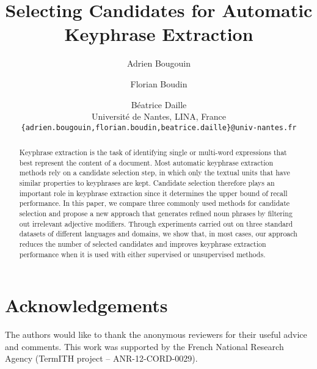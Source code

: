\documentclass[11pt]{article}
\title{Selecting Candidates for Automatic Keyphrase Extraction}
\author{
  Adrien Bougouin \and Florian Boudin \and Béatrice Daille\\
  Université de Nantes, LINA, France\\
  {\tt \{adrien.bougouin,florian.boudin,beatrice.daille\}@univ-nantes.fr}
}
\date{}
\begin{document}
  \maketitle
  \begin{abstract}
    Keyphrase extraction is the task of identifying single or multi-word
    expressions that best represent the content of a document. Most automatic
    keyphrase extraction methods rely on a candidate selection step, in which
    only the textual units that have similar properties to keyphrases are kept.
    Candidate selection therefore plays an important role in keyphrase
    extraction since it determines the upper bound of recall performance. In
    this paper, we compare three commonly used methods for candidate selection
    and propose a new approach that generates refined noun phrases by filtering
    out irrelevant adjective modifiers. Through experiments carried out on three
    standard datasets of different languages and domains, we show that, in most
    cases, our approach reduces the number of selected candidates and improves
    keyphrase extraction performance when it is used with either supervised or
    unsupervised methods.
  \end{abstract}

  

  \section*{Acknowledgements}
  The authors would like to thank the anonymous reviewers for their useful
  advice and comments. This work was supported by the French National Research
  Agency (TermITH project -- ANR-12-CORD-0029).

  
  
\end{document}
